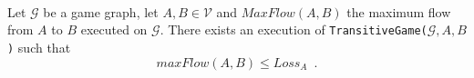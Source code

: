 \begin{lemma} \ \\
  \label{maxflowgame}
  Let $\mathcal{G}$ be a game graph, let $A, B \in \mathcal{V}$ and $MaxFlow\left(A, B\right)$ the maximum flow from
  $A$ to $B$ executed on $\mathcal{G}$. There exists an execution of
  \texttt{TransitiveGame(}$\mathcal{G}, A, B$\texttt{)} such that
  \begin{equation*}
    maxFlow\left(A, B\right) \leq Loss_A \enspace.
  \end{equation*}
\end{lemma}
